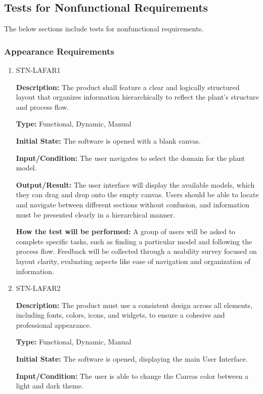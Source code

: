 \documentclass[12pt, titlepage]{article}
\begin{document}
\subsection{Tests for Nonfunctional Requirements}
The below sections include tests for nonfunctional requirements. 

\subsubsection{Appearance Requirements}

\begin{enumerate}
    \item{STN-LAFAR1\\}

    \textbf{Description:} The product shall feature a clear and logically structured layout that organizes information hierarchically to reflect the plant’s structure and process flow.

    \textbf{Type:} Functional, Dynamic, Manual

    \textbf{Initial State:} The software is opened with a blank canvas.

    \textbf{Input/Condition:} The user navigates to select the domain for the plant model.

    \textbf{Output/Result:} The user interface will display the available models, which they can drag and drop onto the empty canvas. Users should be able to locate and navigate between different sections without confusion, and information must be presented clearly in a hierarchical manner.

    \textbf{How the test will be performed:} A group of users will be asked to complete specific tasks, such as finding a particular model and following the process flow. Feedback will be collected through a usability survey focused on layout clarity, evaluating aspects like ease of navigation and organization of information.

    \item{STN-LAFAR2\\}

\textbf{Description:} The product must use a consistent design across all elements, including fonts, colors, icons, and widgets, to ensure a cohesive and professional appearance.

\textbf{Type:} Functional, Dynamic, Manual

\textbf{Initial State:} The software is opened, displaying the main User Interface.

\textbf{Input/Condition:} The user is able to change the Canvas color between a light and dark theme.


\end{enumerate}
\end{document}
